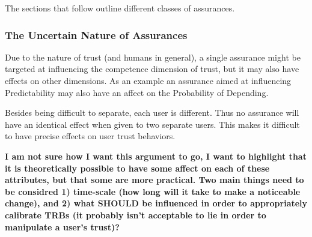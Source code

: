     The sections that follow outline different classes of assurances.

    
    
    
    

    \subsubsection{The Uncertain Nature of Assurances}
        Due to the nature of trust (and humans in general), a single assurance might be targeted at influencing the competence dimension of trust, but it may also have effects on other dimensions. As an example an assurance aimed at influencing Predictability may also have an affect on the Probability of Depending.

        Besides being difficult to separate, each user is different. Thus no assurance will have an identical effect when given to two separate users. This makes it difficult to have precise effects on user trust behaviors.

        \textbf{I am not sure how I want this argument to go, I want to highlight that it is theoretically possible to have some affect on each of these attributes, but that some are more practical. Two main things need to be considred 1) time-scale (how long will it take to make a noticeable change), and 2) what SHOULD be influenced in order to appropriately calibrate TRBs (it probably isn't acceptable to lie in order to manipulate a user's trust)?}
